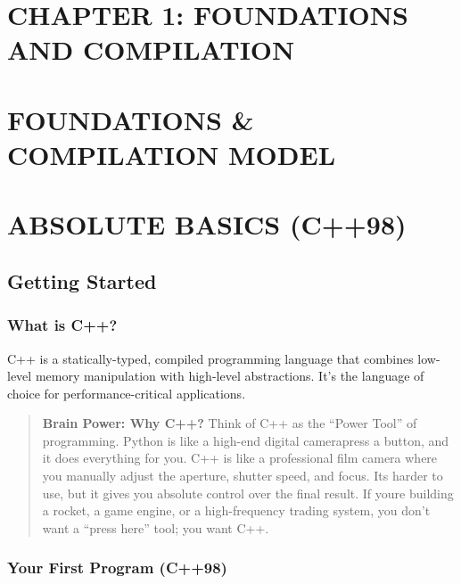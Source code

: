 \hypertarget{chapter-1-foundations-and-compilation}{%
\section{CHAPTER 1: FOUNDATIONS AND
COMPILATION}\label{chapter-1-foundations-and-compilation}}

\hypertarget{foundations-compilation-model}{%
\section{FOUNDATIONS \& COMPILATION
MODEL}\label{foundations-compilation-model}}

\hypertarget{absolute-basics-c98}{%
\section{ABSOLUTE BASICS (C++98)}\label{absolute-basics-c98}}

\hypertarget{getting-started}{%
\subsection{Getting Started}\label{getting-started}}

\hypertarget{what-is-c}{%
\subsubsection{What is C++?}\label{what-is-c}}

C++ is a statically-typed, compiled programming language that combines
low-level memory manipulation with high-level abstractions. It's the
language of choice for performance-critical applications.

\begin{quote}
\textbf{Brain Power: Why C++?} Think of C++ as the ``Power Tool'' of
programming. Python is like a high-end digital camerapress a button, and
it does everything for you. C++ is like a professional film camera where
you manually adjust the aperture, shutter speed, and focus. Its harder
to use, but it gives you absolute control over the final result. If
youre building a rocket, a game engine, or a high-frequency trading
system, you don't want a ``press here'' tool; you want C++.
\end{quote}

\hypertarget{your-first-program-c98}{%
\subsubsection{Your First Program
(C++98)}\label{your-first-program-c98}}

